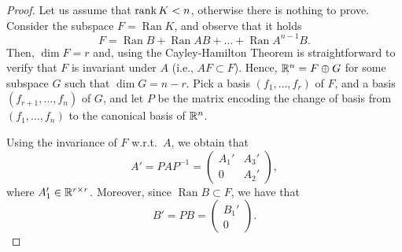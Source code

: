 \begin{proof}
    Let us assume that $\operatorname{rank} K < n$, otherwise there is nothing to prove.
    Consider the subspace $F=\operatorname{Ran} K$, and observe that it holds 
    \begin{equation}
        F =\operatorname{Ran} B + \operatorname{Ran} AB + \ldots +\operatorname{Ran} A^{n-1}B.
    \end{equation}
    Then, $\dim F=r$ and, using the Cayley-Hamilton Theorem is straightforward to verify that $F$ is invariant under $A$ (i.e., $AF\subset F$).
    Hence, $\mathbb{R}^n = F\oplus G$ for some subspace $G$ such that $\dim G=n-r$.
    Pick   a basis $(f_1,\ldots, f_r)$ of $F$, and a basis $(f_{r+1},\ldots, f_n)$ of $G$, and let $P$ be the matrix encoding the change of basis from $(f_1,\ldots, f_n)$ to the canonical basis of $\mathbb{R}^n$.

    Using the invariance of $F$ w.r.t.~$A$, we obtain that 
    \begin{equation}
        A' = PAP^{-1} =
        \begin{pmatrix}
            A_1' & A_3' \\ 
            0 & A_2'
        \end{pmatrix},
    \end{equation}
    where $A_1'\in \mathbb{R}^{r\times r}$. Moreover, since $\operatorname{Ran} B \subset F$, we have that 
    \begin{equation}
        B' = P B = 
        \begin{pmatrix}
            B_1'\\0
        \end{pmatrix}.
    \end{equation}
\end{proof}


